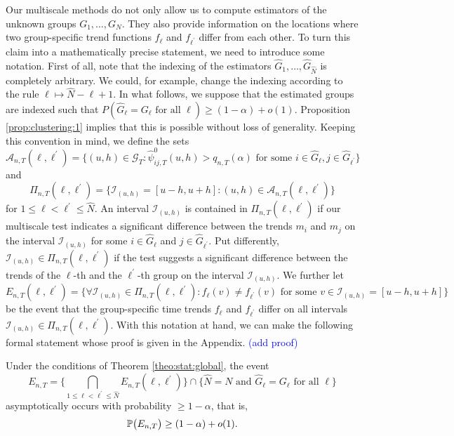 \documentclass[a4paper,12pt]{article}
\begin{document}
Our multiscale methods do not only allow us to compute estimators of the unknown groups $G_1,\ldots, G_N$. They also provide information on the locations where two group-specific trend functions $f_\ell$ and $f_{\ell^\prime}$ differ from each other. To turn this claim into a mathematically precise statement, we need to introduce some notation. First of all, note that the indexing of the estimators $\widehat{G}_1,\ldots,\widehat{G}_{\widehat{N}}$ is completely arbitrary. We could, for example, change the indexing according to the rule $\ell \mapsto \widehat{N} - \ell + 1$. In what follows, we suppose that the estimated groups are indexed such that $P( \widehat{G}_\ell = G_\ell \text{ for all } \ell ) \ge (1-\alpha) + o(1)$. Proposition \ref{prop:clustering:1} implies that this is possible without loss of generality. Keeping this convention in mind, we define the sets 
{\color{red}\[ \mathcal{A}_{n,T}(\ell,\ell^\prime) = \Big\{ (u, h) \in \mathcal{G}_T: \widehat{\psi}^0_{ij, T}(u, h) > q_{n,T}(\alpha) \text{ for some } i \in \widehat{G}_\ell, j \in \widehat{G}_{\ell^\prime} \Big\} \] }
and  
\[ \Pi_{n,T}(\ell,\ell^\prime) = \big\{ \mathcal{I}_{(u, h)} = [u-h, u+h]: (u, h) \in \mathcal{A}_{n,T}(\ell,\ell^\prime) \big\} \]
for $1 \le \ell < \ell^\prime \le \widehat{N}$. An interval $\mathcal{I}_{(u, h)}$ is contained in $\Pi_{n,T}(\ell,\ell^\prime)$ if our multiscale test indicates a significant difference between the trends $m_i$ and $m_j$ on the interval $\mathcal{I}_{(u, h)}$ for some $i \in \widehat{G}_\ell$ and $j \in \widehat{G}_{\ell^\prime}$. Put differently, $\mathcal{I}_{(u, h)} \in \Pi_{n,T}(\ell,\ell^\prime)$ if the test suggests a significant difference between the trends of the $\ell$-th and the $\ell^\prime$-th group on the interval $\mathcal{I}_{(u, h)}$. We further let
\[ E_{n,T}(\ell,\ell^\prime) = \Big\{ \forall \mathcal{I}_{(u, h)} \in \Pi_{n,T}(\ell,\ell^\prime): f_\ell(v) \ne f_{\ell^\prime}(v) \text{ for some } v \in \mathcal{I}_{(u, h)} = [u-h, u+h] \Big\} \]
be the event that the group-specific time trends $f_\ell$ and $f_{\ell^\prime}$ differ on all intervals $\mathcal{I}_{(u, h)} \in \Pi_{n,T}(\ell,\ell^\prime)$. With this notation at hand, we can make the following formal statement whose proof is given in the Appendix. \textcolor{blue}{(add proof)} 
\begin{prop}\label{prop:clustering:2}
Under the conditions of Theorem \ref{theo:stat:global}, the event 
\[ E_{n,T} = \Big\{ \bigcap_{1 \le \ell < \ell^\prime \le \widehat{N}} E_{n,T}(\ell,\ell^\prime) \Big\} \cap \Big\{ \widehat{N} = N \text{ and } \widehat{G}_\ell = G_\ell \text{ for all } \ell \Big\} \]
asymptotically occurs with probability $\ge 1-\alpha$, that is, 
\[ \mathbb{P} \big( E_{n,T} \big) \ge (1 - \alpha) + o(1). \]
\end{prop}
\end{document}
